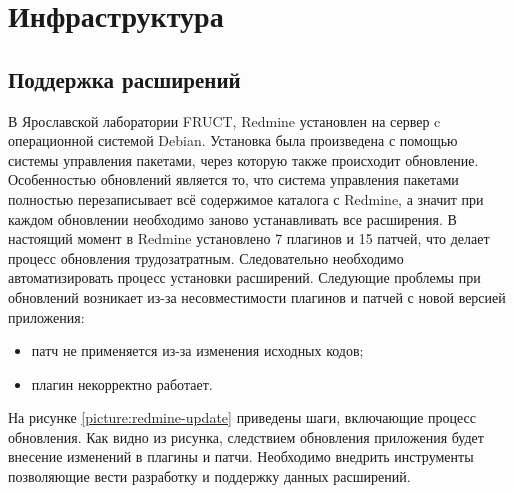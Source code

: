 \chapter{Инфраструктура}
\section{Поддержка расширений}
В Ярославской лаборатории FRUCT, Redmine установлен на сервер c операционной
системой Debian. Установка была произведена с помощью системы управления
пакетами, через которую также происходит обновление. Особенностью обновлений
является то, что система управления пакетами полностью перезаписывает всё
содержимое каталога с Redmine, а значит при каждом обновлении необходимо заново
устанавливать все расширения. В настоящий момент в Redmine установлено 7
плагинов и 15 патчей, что делает процесс обновления трудозатратным.
Следовательно необходимо автоматизировать процесс установки расширений.
Следующие проблемы при обновлений возникает из-за несовместимости плагинов и
патчей с новой версией приложения:
\begin{itemize}
  \item патч не применяется из-за изменения исходных кодов;
  \item плагин некорректно работает.
\end{itemize}
На рисунке \ref{picture:redmine-update} приведены шаги, включающие процесс
обновления. Как видно из рисунка, следствием обновления приложения будет
внесение изменений в плагины и патчи. Необходимо внедрить инструменты
позволяющие вести разработку и поддержку данных расширений.

